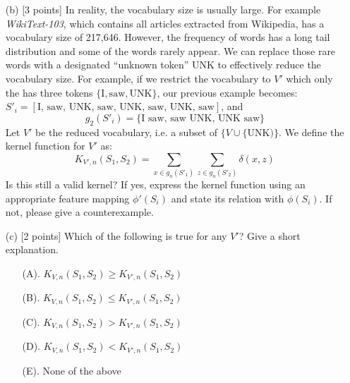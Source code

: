 \documentclass{article}
\newif\ifsolutions
\newenvironment{labelledanswer}{{\bf Answer:} \sf }{}%
\newcommand{\answer}[2]
{{
\ifsolutions
\begin{labelledanswer}
\color{red} 
#2
\end{labelledanswer}
\else
#1
\fi
}}
\begin{document}
\begin{itemize}
    \item[(b)] [3 points] In reality, the vocabulary size is usually large. For example {\it WikiText-103}, which contains all articles extracted from Wikipedia, has a vocabulary size of 217,646. However, the frequency of words has a long tail distribution and some of the words rarely appear. We can replace those rare words with a designated ``unknown token'' UNK to effectively reduce the vocabulary size. For example, if we restrict the vocabulary to $V'$ which only the has three tokens $\{ \text{I}, \text{saw}, \text{UNK}\}$, our previous example becomes: $S'_i = [\text{I, saw, UNK, saw, UNK, saw, UNK, saw}]$, and
    $$
        g_2(S'_i) = \{\text{I saw},\, \text{saw UNK}, \, \text{UNK saw}\}
    $$
    Let $V'$ be the reduced vocabulary, i.e. a subset of $\{V \cup \{\text{UNK})\}$.
    We define the kernel function for $V'$ as:
        $$
        K_{V', n}(S_1, S_2) = \sum_{x\in g_n(S'_1)} \sum_{z\in g_n(S'_2)} \delta(x, z)
    $$
    Is this still a valid kernel? If yes, express the kernel function using an appropriate feature mapping $\phi'(S_i)$ and state its relation with $\phi(S_i)$. If not, please give a counterexample.
    
    \answer{}{
This should still be a valid kernel mapping as nothing has fundamentally changed. All the rare words are mapped to the "unknown token" UNK for all string. In a way, the feature map here seems to combine 2 feature mapping, first map to UNK tokens, and then second part is the same as the part above.\\

The feature map is updated to be:  $\phi'(S_i) =  |{(n_1, n_2): s = n_1 \cup n_2}|$ \\
    }
    
    \clearpage  
    
    \item[(c)] [2 points] Which of the following is true for any $V'$? Give a short explanation. 
    \begin{enumerate}
        \item [(A).] $K_{V, n}(S_1, S_2) \geq K_{V', n}(S_1, S_2)$
        \item [(B).] $K_{V, n}(S_1, S_2) \leq K_{V', n}(S_1, S_2)$
        \item [(C).] $K_{V, n}(S_1, S_2) > K_{V', n}(S_1, S_2)$
        \item [(D).] $K_{V, n}(S_1, S_2) < K_{V', n}(S_1, S_2)$
        \item [(E).] None of the above
    \end{enumerate}
    

\end{itemize}
\end{document}
